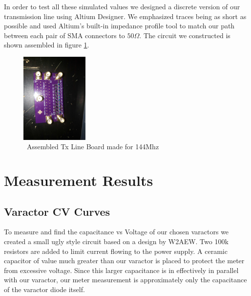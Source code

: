 \documentclass[journal]{IEEEtran}
\begin{document}
In order to test all these simulated values we designed a discrete version of our transmission line using Altium Designer. We emphasized traces being as short as possible and used Altium's built-in impedance profile tool to match our path between each pair of SMA connectors to $50\Omega$. The circuit we constructed is shown assembled in figure \ref{fig:assembled}.


\begin{figure}[htb]
\centering
\includegraphics[width=0.3\textwidth, angle = 90]{AssembledBoard.jpg}
\caption{\ Assembled Tx Line Board made for 144Mhz
}\label{fig:assembled}
\end{figure}





\section{ Measurement Results }






\subsection{Varactor CV Curves}\label{subsec:CVCurves}

To measure and find the capacitance vs Voltage of our chosen varactors we created a small ugly style circuit based on a design by W2AEW. Two 100k resistors are added to limit current flowing to the power supply. A ceramic capacitor of value much greater than our varactor is placed to protect the meter from excessive voltage. Since this larger capacitance is in effectively in parallel with our varactor, our meter measurement is approximately only the capacitance of the varactor diode itself. 
\end{document}
